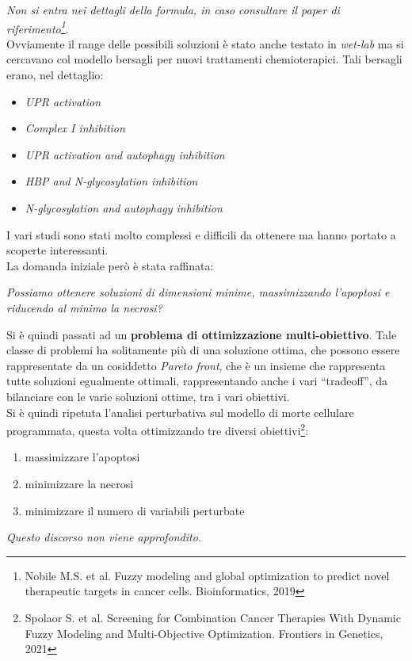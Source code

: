 \documentclass[a4paper,12pt, oneside]{book}
\begin{document}
\textit{Non si entra nei dettagli della formula, in caso consultare il paper di
  riferimento\footnote{Nobile M.S. et al. Fuzzy modeling and global optimization
    to predict novel therapeutic 
    targets in cancer cells. Bioinformatics, 2019}}.\\
Ovviamente il range delle possibili soluzioni è stato anche testato in
\textit{wet-lab} ma si cercavano col modello bersagli per nuovi trattamenti
chemioterapici. Tali bersagli erano, nel dettaglio:
\begin{itemize}
  \item \textit{UPR activation}
  \item \textit{Complex I inhibition}
  \item \textit{UPR activation and autophagy inhibition}
  \item \textit{HBP and N-glycosylation inhibition}
  \item \textit{N-glycosylation and autophagy inhibition}
\end{itemize}
I vari studi sono stati molto complessi e difficili da ottenere ma hanno portato
a scoperte interessanti.\\
La domanda iniziale però è stata raffinata:
\begin{center}
  \textit{Possiamo ottenere soluzioni di dimensioni minime, massimizzando
    l'apoptosi e riducendo al minimo la necrosi?} 
\end{center}
Si è quindi passati ad un \textbf{problema di ottimizzazione
  multi-obiettivo}. Tale classe di problemi ha solitamente più di una soluzione
ottima, che possono essere rappresentate da un cosiddetto \textit{Pareto front},
che è un insieme che rappresenta tutte soluzioni egualmente ottimali,
rappresentando 
anche i vari ``tradeoff'', da bilanciare con le varie soluzioni ottime, tra i
vari obiettivi. \\
Si è quindi ripetuta l'analisi perturbativa sul modello di morte cellulare
programmata, questa volta ottimizzando tre diversi obiettivi\footnote{Spolaor
  S. et al. Screening for Combination Cancer Therapies With Dynamic Fuzzy
  Modeling and Multi-Objective Optimization. Frontiers in Genetics, 2021}: 
\begin{enumerate}
  \item massimizzare l'apoptosi
  \item minimizzare la necrosi
  \item minimizzare il numero di variabili perturbate
\end{enumerate}
\textit{Questo discorso non viene approfondito}.\\
\end{document}
